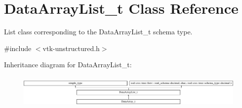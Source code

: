 \hypertarget{classDataArrayList__t}{}\section{Data\+Array\+List\+\_\+t Class Reference}
\label{classDataArrayList__t}


List class corresponding to the Data\+Array\+List\+\_\+t schema type.  




{\ttfamily \#include $<$vtk-\/unstructured.\+h$>$}

Inheritance diagram for Data\+Array\+List\+\_\+t\+:\begin{figure}[H]
\begin{center}
\leavevmode
\includegraphics[height=1.660079cm]{classDataArrayList__t}
\end{center}
\end{figure}
